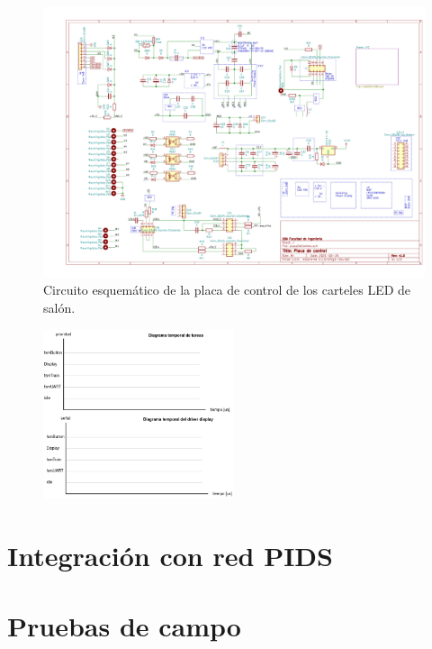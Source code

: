 \begin{figure}[ht]
	\centering
	\includegraphics[width=1\textwidth]{./Figures/output.placaControl.pdf}
	\caption{Circuito esquemático de la placa de control de los carteles LED de salón.}
	\label{fig:schController}
\end{figure}


\begin{figure}[ht]
	\centering
	\includegraphics[width=0.5\textwidth]{./Figures/diagramasTemporales.png}
	\caption{}
	\label{fig:diagramasTemporales}
\end{figure}

\pagebreak
\section{Integración con red PIDS}

\pagebreak
\section{Pruebas de campo}